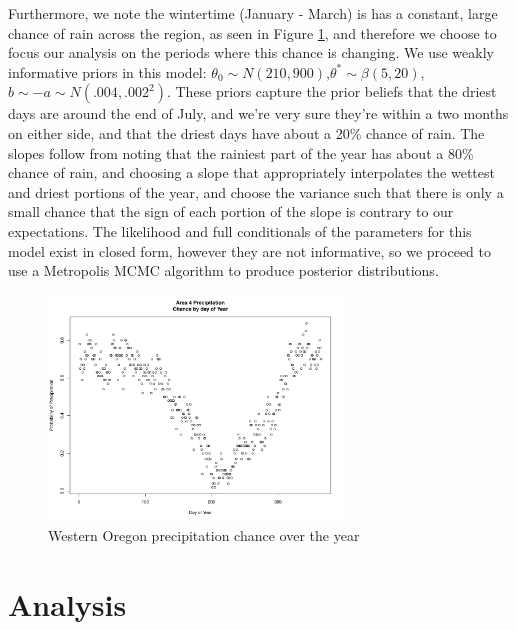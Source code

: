 \documentclass{article}
\begin{document}
Furthermore, we note the wintertime (January - March) is has a constant, large chance of rain across the region, as seen in Figure \ref{fig:area4}, and therefore we choose to focus our analysis on the periods where this chance is changing. 
We use weakly informative priors in this model: $\theta_0 \sim N(210,900)$,$\theta^* \sim \beta(5,20)$, $b \sim -a \sim N(.004,.002^2)$. These priors capture the prior beliefs that the driest days are around the end of July, and we're very sure they're within a two months on either side, and that the driest days have about a 20\% chance of rain. 
The slopes follow from noting that the rainiest part of the year has about a 80\% chance of rain, and choosing a slope that appropriately interpolates the wettest and driest portions of the year, and choose the variance such that there is only a small chance that the sign of each portion of the slope is contrary to our expectations.
The likelihood and full conditionals of the parameters for this model exist in closed form, however they are not informative, so we proceed to use a Metropolis MCMC algorithm to produce posterior distributions.

\begin{figure}[h!]
\centering
\includegraphics[width = .4\textwidth, height = 6cm]{Area4PrecipByDay}
\caption{Western Oregon precipitation chance over the year}
\label{fig:area4}
\end{figure}


\section{Analysis}
\end{document}
